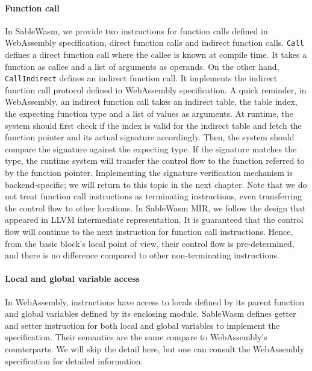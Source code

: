 \paragraph{Function call}
In SableWasm, we provide two instructions for function calls defined in WebAssembly specification, direct function calls and indirect function calls. \texttt{Call} defines a direct function call where the callee is known at compile time. It takes a function as callee and a list of arguments as operands. On the other hand, \texttt{CallIndirect} defines an indirect function call. It implements the indirect function call protocol defined in WebAssembly specification. A quick reminder, in WebAssembly, an indirect function call takes an indirect table, the table index, the expecting function type and a list of values as arguments. At runtime, the system should first check if the index is valid for the indirect table and fetch the function pointer and its actual signature accordingly. Then, the system should compare the signature against the expecting type. If the signature matches the type, the runtime system will transfer the control flow to the function referred to by the function pointer. Implementing the signature verification mechanism is backend-specific; we will return to this topic in the next chapter. Note that we do not treat function call instructions as terminating instructions, even transferring the control flow to other locations. In SableWasm MIR, we follow the design that appeared in LLVM intermediate representation. It is guaranteed that the control flow will continue to the next instruction for function call instructions. Hence, from the basic block's local point of view, their control flow is pre-determined, and there is no difference compared to other non-terminating instructions.

\paragraph{Local and global variable access}
In WebAssembly, instructions have access to locals defined by its parent function and global variables defined by its enclosing module. SableWasm defines getter and setter instruction for both local and global variables to implement the specification. Their semantics are the same compare to WebAssembly's counterparts. We will skip the detail here, but one can consult the WebAssembly specification for detailed information.

